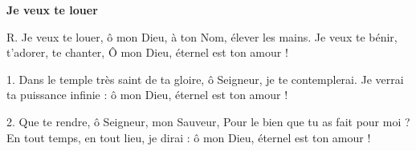 \textbf{Je veux te louer}

R. Je veux te louer, ô mon Dieu, à ton Nom, élever les mains.
Je veux te bénir, t’adorer, te chanter, Ô mon Dieu, éternel est ton amour !

1. Dans le temple très saint de ta gloire, ô Seigneur, je te contemplerai.
Je verrai ta puissance infinie : ô mon Dieu, éternel est ton amour !

2. Que te rendre, ô Seigneur, mon Sauveur, Pour le bien que tu as fait pour moi ? En tout temps, en tout lieu, je dirai : ô mon Dieu, éternel est ton amour !
